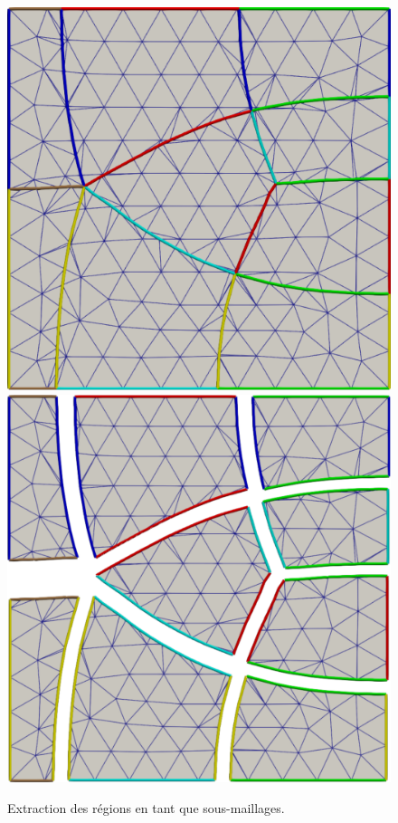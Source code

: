\begin{figure}[h!]
\centering
\includegraphics[scale=0.29]{images/separatrice_echantillonage_1.pdf}
\hfill
\includegraphics[scale=0.347]{images/separatrice_echantillonage_2.pdf}
\caption{Extraction des régions en tant que sous-maillages.}
\label{fig:separatrice_echantillonage}
\end{figure}

